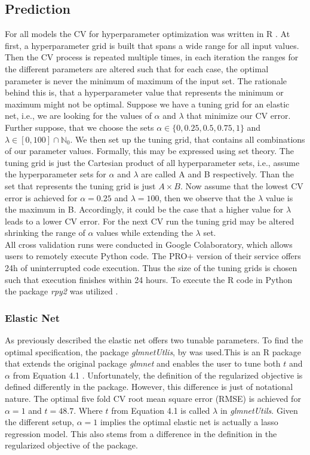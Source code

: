 \documentclass[a4paper,12pt, headsepline]{scrartcl}
\numberwithin{equation}{section}
\begin{document}
\subsection{Prediction}\label{subsec:pred}
For all models the CV for hyperparameter optimization was written in R \citep{R}. At first, a hyperparameter grid is built that spans a wide range for all input values. Then the CV process is repeated multiple times, in each iteration the ranges for the different parameters are altered such that for each case, the optimal parameter is never the minimum of maximum of the input set. The rationale behind this is, that a hyperparameter value that represents the minimum or maximum might not be optimal. Suppose we have a tuning grid for an elastic net, i.e., we are looking for the values of $\alpha$ and $\lambda$ that minimize our CV error. Further suppose, that we choose the sets $\alpha \in \{0, 0.25, 0.5, 0.75, 1\}$ and $\lambda \in [0, 100] \cap \mathbb{N}_0$. We then set up the tuning grid, that contains all combinations of our parameter values. Formally, this may be expressed using set theory. The tuning grid is just the Cartesian product of all hyperparameter sets, i.e., assume the hyperparameter sets for $\alpha$ and $\lambda$ are called A and B respectively. Than the set that represents the tuning grid is just $A \times B$. Now assume that the lowest CV error is achieved for $\alpha = 0.25$ and $\lambda = 100$, then we observe that the $\lambda$ value is the maximum in B. Accordingly, it could be the case that a higher value for $\lambda$ leads to a lower CV error. For the next CV run the tuning grid may be altered shrinking the range of $\alpha$ values while extending the $\lambda$ set.\\
All cross validation runs were conducted in Google Colaboratory, which allows users to remotely execute Python code. The PRO+ version of their service offers 24h of uninterrupted code execution. Thus the size of the tuning grids is chosen such that execution finishes within 24 hours. To execute the R code in Python the package \textit{rpy2} was utilized \citep{rpy2}.

\subsubsection{Elastic Net}
As previously described the elastic net offers two tunable parameters. To find the optimal specification, the package \textit{glmnetUtlis}, by \citet{glmnetUtils} was used.This is an R package that extends the original package \textit{glmnet} and enables the user to tune both $t$ and $\alpha$ from Equation 4.1 \citep{glmnet}. Unfortunately, the definition of the regularized objective is defined differently in the package. However, this difference is just of notational nature. The optimal five fold CV root mean square error (RMSE) is achieved for $\alpha = 1$ and $t = 48.7$. Where $t$ from Equation 4.1 is called $\lambda$ in \textit{glmnetUtils}. Given the different setup, $\alpha = 1$ implies the optimal elastic net is actually a lasso regression model. This also stems from a difference in the definition in the regularized objective of the package. 
\end{document}
